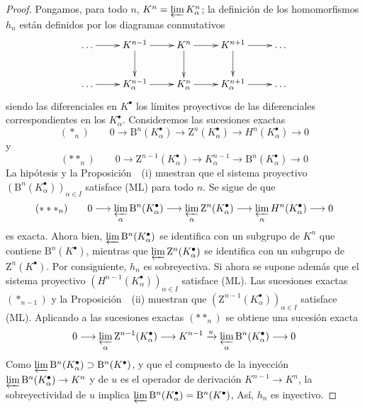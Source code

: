 \begin{proof}
Pongamos, para todo $n$, $K^n=\varprojlim K_\alpha^n$; la definición de los homomorfismos $h_n$ están definidos por los diagramas conmutativos
\[
\xymatrix{
\ldots\ar[r]&K^{n-1}\ar[r]\ar[d]&K^n\ar[r]\ar[d]
&K^{n+1}\ar[r]\ar[d]&\ldots\\
\ldots\ar[r]&K_\alpha^{n-1}\ar[r]&K_\alpha^n\ar[r]
&K_\alpha^{n+1}\ar[r]&\ldots
}
\]
siendo las diferenciales en $K^\bullet$ los límites proyectivos
de las diferenciales correspondientes en los
$K_\alpha^\bullet$.
Consideremos las sucesiones exactas
\[
(*_n)\qquad
0\longrightarrow \mathrm B^n(K_\alpha^\bullet)
\longrightarrow \mathrm Z^n(K_\alpha^\bullet)
\longrightarrow H^n(K_\alpha^\bullet)\longrightarrow0
\]
y
\[
(**_n)\qquad
0\longrightarrow \mathrm Z^{n-1}(K_\alpha^\bullet)
\longrightarrow K_\alpha^{n-1}
\longrightarrow \mathrm B^n(K_\alpha^\bullet)\longrightarrow0
\]
La hipótesis y la Proposición~~(i) muestran que el
sistema proyectivo
$(\mathrm B^n(K_\alpha^\bullet))_{\alpha\in I}$
satisface (ML) para todo $n$.
Se sigue de  que
\[
(***_n)\qquad
0\longrightarrow\varprojlim_\alpha\mathrm B^n(K_\alpha^\bullet)
\longrightarrow\varprojlim_\alpha\mathrm Z^n(K_\alpha^\bullet)
\longrightarrow\varprojlim_\alpha H^n(K_\alpha^\bullet)
\longrightarrow0
\]
es exacta.
Ahora bien,
$\varprojlim\mathrm B^n(K_\alpha^\bullet)$
se identifica con un subgrupo de $K^n$ que contiene
$\mathrm B^n(K^\bullet)$, mientras que
$\varprojlim\mathrm Z^n(K_\alpha^\bullet)$
se identifica con un subgrupo de $\mathrm Z^n(K^\bullet)$.
Por consiguiente, $h_n$ es sobreyectiva. Si ahora se supone además que el sistema proyectivo $(H^{n-1}(K_\alpha^\bullet))_{\alpha\in I}$
satisface (ML).
Las sucesiones exactas $(*_{n-1})$ y la
Proposición~~(ii) muestran que
$(\mathrm Z^{n-1}(K_\alpha^\bullet))_{\alpha\in I}$
satisface (ML).
Aplicando  a las sucesiones exactas $(**_n)$ se obtiene una
sucesión exacta
\[
0\longrightarrow
\varprojlim_\alpha\mathrm Z^{n-1}(K_\alpha^\bullet)
\longrightarrow K^{n-1}\xrightarrow{u}
\varprojlim_\alpha\mathrm B^n(K_\alpha^\bullet)
\longrightarrow0
\]
Como
$\varprojlim\mathrm B^n(K_\alpha^\bullet)
\supset\mathrm B^n(K^\bullet)$, y que el compuesto de la inyección $\varprojlim\mathrm B^n(K_\alpha^\bullet)\to K^n$ y de $u$ es el operador de derivación $K^{n-1}\to K^n$, la sobreyectividad de
$u$ implica
$\varprojlim\mathrm B^n(K_\alpha^\bullet)
=\mathrm B^n(K^\bullet)$,
Así, $h_n$ es inyectivo.
\end{proof}

